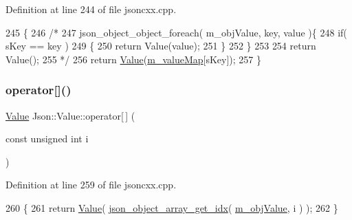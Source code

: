 Definition at line 244 of file jsoncxx.\+cpp.


\begin{DoxyCode}
245     \{
246         \textcolor{comment}{/*}
247 \textcolor{comment}{        json\_object\_object\_foreach( m\_objValue, key, value )\{}
248 \textcolor{comment}{            if( sKey == key )}
249 \textcolor{comment}{            \{}
250 \textcolor{comment}{                return Value(value);}
251 \textcolor{comment}{            \}}
252 \textcolor{comment}{        \}}
253 \textcolor{comment}{}
254 \textcolor{comment}{        return Value();}
255 \textcolor{comment}{        */}
256         \textcolor{keywordflow}{return} \hyperlink{class_json_1_1_value_a3dd8ad60321f45f8d51c864e3a96a848}{Value}(\hyperlink{class_json_1_1_value_a2b9203575d8ff75f02d30e09befb1204}{m\_valueMap}[sKey]);
257     \}
\end{DoxyCode}
\mbox{\label{class_json_1_1_value_a9cc9f4b9ec45429586e60472a7c25059}} 
\subsubsection{\texorpdfstring{operator[]()}{operator[]()}\hspace{0.1cm}{\footnotesize\ttfamily [2/2]}}
{\footnotesize\ttfamily \hyperlink{class_json_1_1_value}{Value} Json\+::\+Value\+::operator\mbox{[}$\,$\mbox{]} (\begin{DoxyParamCaption}\item[{const unsigned int}]{i }\end{DoxyParamCaption})}



Definition at line 259 of file jsoncxx.\+cpp.


\begin{DoxyCode}
260     \{
261         \textcolor{keywordflow}{return} \hyperlink{class_json_1_1_value_a3dd8ad60321f45f8d51c864e3a96a848}{Value}( \hyperlink{json__object_8c_ad1add4f980f1568f3cdc6d22521bf9e1}{json\_object\_array\_get\_idx}( 
      \hyperlink{class_json_1_1_value_a3a705e06c2dbc4a6e142b58b0cbca57e}{m\_objValue}, i ) );
262     \}
\end{DoxyCode}
\mbox{\label{class_json_1_1_value_a03430deb0b2a143e0fe2d743cceabab3}} 

